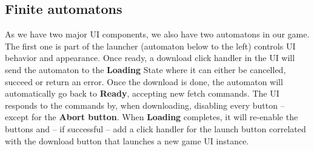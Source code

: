 \documentclass[10pt]{scrartcl}
\begin{document}
\subsection{Finite automatons}
As we have two major UI components, we also have two automatons in our game. The first one is part of the launcher (automaton below to the left) controls UI behavior and appearance. Once ready, a download click handler in the UI will send the automaton to the \textbf{Loading} State where it can either be cancelled, succeed or return an error. Once the download is done, the automaton will automatically go back to \textbf{Ready}, accepting new fetch commands. The UI responds to the commands by, when downloading, disabling every button -- except for the \textbf{Abort button}. When \textbf{Loading} completes, it will re-enable the buttons and -- if successful -- add a click handler for the launch button correlated with the download button that launches a new game UI instance. 
\end{document}
